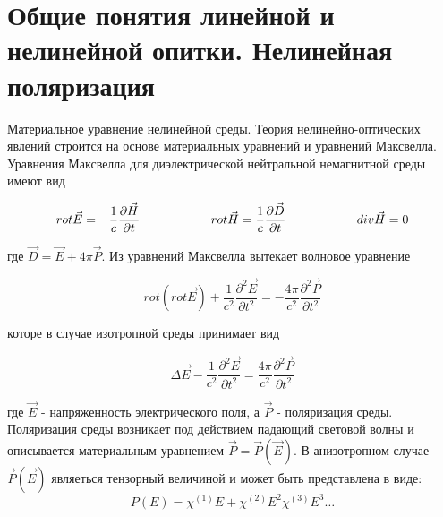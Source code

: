 \section{Общие понятия линейной и нелинейной опитки. Нелинейная поляризация}
Материальное уравнение нелинейной среды. Теория нелинейно-оптических явлений строится на основе материальных уравнений и уравнений
Максвелла. Уравнения Максвелла для диэлектрической нейтральной немагнитной среды имеют вид

\begin{equation}\label{1:1}
rot\vec{E} = - \frac{ 1 }{ c}\frac{\partial \vec{H} }{\partial t}
\hspace{20mm}
rot\vec{H} =  \frac{ 1 }{ c}\frac{\partial \vec{D} }{\partial t}
\hspace{20mm}
div\vec{H} = 0
\end{equation}

где $ \vec{D} = \vec{E} + 4\pi \vec{P}$. Из уравнений Максвелла вытекает волновое уравнение

\begin{equation}\label{1:2}
rot(rot\vec{E}) + \frac{ 1 }{ c^2 }\frac{\partial^2 \vec{E} }{\partial t^2} = - \frac{ 4\pi }{ c^2 }\frac{\partial^2 \vec{P} }{\partial t^2}
\end{equation}

которе в случае изотропной среды принимает вид

\begin{equation}\label{1:3}
\Delta\vec{E} - \frac{ 1 }{ c^2 }\frac{\partial^2 \vec{E} }{\partial t^2} =  \frac{ 4\pi }{ c^2 }\frac{\partial^2 \vec{P} }{\partial t^2}
\end{equation}

где $\vec{E}$ - напряженность электрического поля, а $\vec{P}$ - поляризация среды. Поляризация среды возникает под действием падающий световой волны и описывается материальным уравнением $\vec{P} = \vec{P}(\vec{E})$.
В анизотропном случае $\vec{P}(\vec{E})$ являеться тензорный величиной и может быть представлена в виде:
\begin{equation}\label{1:4}
P(E) = \chi^{(1)}E + \chi^{(2)}E^2 \chi^{(3)}E^3\dots
\end{equation}

